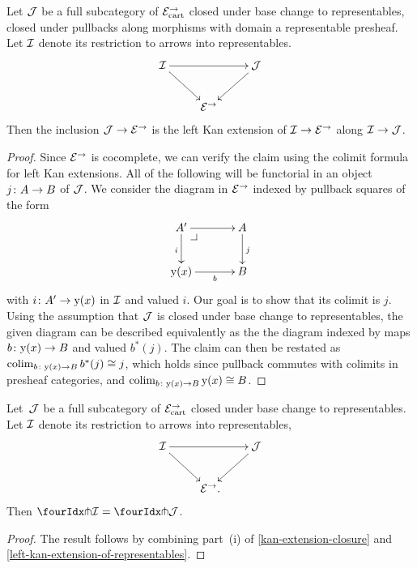 \documentclass[reqno,10pt,a4paper,oneside,draft]{amsart}
\begin{document}
\begin{lemma} \label{left-kan-extension-of-representables}
Let $\cal{J}$ be a full subcategory of $\catE_{\cart}^\to$ closed under base change to representables, \ie closed under pullbacks along morphisms with domain a representable presheaf.
Let $\cal{I}$ denote its restriction to arrows into representables.
\[
\xymatrix{
  \cal{I}
  \ar[rr]
  \ar[dr]
&&
  \cal{J}
  \ar[dl]
\\&
  \catE^\to
}
\]
Then the inclusion $\cal{J} \to \catE^\to$ is the left Kan extension of $\cal{I} \to \catE^\to$ along $\cal{I} \to \cal{J}$.
\end{lemma}

\begin{proof}
Since $\catE^\to$ is cocomplete, we can verify the claim using the colimit formula for left Kan extensions.
All of the following will be functorial in an object $j \co A \to B$ of $\cal{J}$.
We consider the diagram in $\catE^\to$ indexed by pullback squares of the form
\[
\xymatrix@C=1.2cm{
  A'
  \ar[r]
  \ar[d]_{i}
  \pullback{dr}
&
  A
  \ar[d]^{j}
\\
  \yon(x)
  \ar[r]_-{b}
&
  B
}
\]
with $i \co A' \to \yon(x)$ in $\cal{I}$ and valued $i$.
Our goal is to show that its colimit is $j$.
Using the assumption that $\cal{J}$ is closed under base change to representables, the given diagram can be described equivalently as the the diagram indexed by maps $b \co \yon(x) \to B$ and valued $b^*(j)$.
The claim can then be restated as $\colim_{b \co \yon(x) \to B} b^*(j) \iso j$, which holds since pullback commutes with colimits in presheaf categories, and $\colim_{b \co \yon(x) \to B} \yon(x) \iso B$.
\end{proof}

\begin{proposition} \label{awfs-on-arrows-into-representables}
Let~$\cal{J}$ be a full subcategory of $\catE_{\cart}^\to$ closed under base change to representables.
Let $\cal{I}$ denote its restriction to arrows into representables,
\[
\xymatrix{
  \cal{I}
  \ar[rr]
  \ar[dr]
&&
  \cal{J}
  \ar[dl]
\\&
  \catE^\to
\rlap{.}}
\]
Then $\liftr{\cal{I}} = \liftr{\cal{J}}$.
\end{proposition}

\begin{proof}
The result follows by combining part~(i) of \cref{kan-extension-closure} and \cref{left-kan-extension-of-representables}.
\end{proof}
\end{document}
